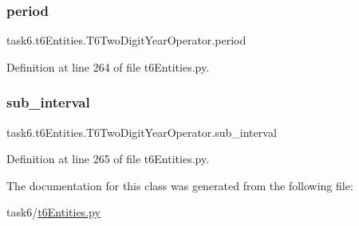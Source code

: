 \subsubsection{\texorpdfstring{period}{period}}
{\footnotesize\ttfamily task6.\+t6\+Entities.\+T6\+Two\+Digit\+Year\+Operator.\+period}



Definition at line 264 of file t6\+Entities.\+py.

\mbox{\label{classtask6_1_1t6Entities_1_1T6TwoDigitYearOperator_a324e05be351f629bd65001d558ba168c}} 
\subsubsection{\texorpdfstring{sub\+\_\+interval}{sub\_interval}}
{\footnotesize\ttfamily task6.\+t6\+Entities.\+T6\+Two\+Digit\+Year\+Operator.\+sub\+\_\+interval}



Definition at line 265 of file t6\+Entities.\+py.



The documentation for this class was generated from the following file\+:\begin{DoxyCompactItemize}
\item 
task6/\hyperlink{t6Entities_8py}{t6\+Entities.\+py}\end{DoxyCompactItemize}

